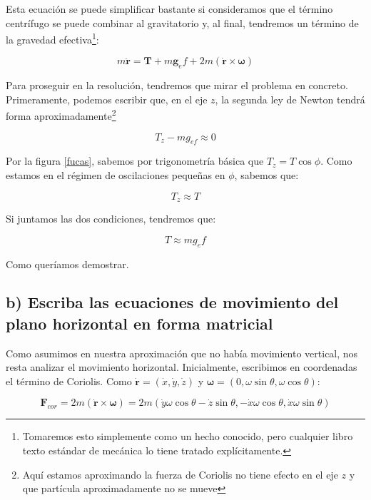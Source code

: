 \documentclass[a4paper,12pt]{article}
\begin{document}
Esta ecuación se puede simplificar bastante si consideramos que el término centrífugo se puede combinar al gravitatorio y, al final, tendremos un término de la gravedad efectiva\footnote{Tomaremos esto simplemente como un hecho conocido, pero cualquier libro texto estándar de mecánica lo tiene tratado explícitamente.}:

\begin{equation}
  \label{initialus1}
  m \ddot{\boldsymbol{r}} = \boldsymbol{T} + m\boldsymbol{g}_ef + 2m (\dot{\boldsymbol{r}} \times \boldsymbol{\omega})
\end{equation}

Para proseguir en la resolución, tendremos que mirar el problema en concreto. Primeramente, podemos escribir que, en el eje $z$, la segunda ley de Newton tendrá forma aproximadamente\footnote{Aquí estamos aproximando la fuerza de Coriolis no tiene efecto en el eje $z$ y que partícula aproximadamente no se mueve   } 

$$T_{z} - mg_{ef} \approx 0$$

Por la figura \ref{fucas}, sabemos por trigonometría básica que $T_{z} = T \cos{\phi}$. Como estamos en el régimen de oscilaciones pequeñas en $\phi$, sabemos que:

\begin{equation}
  T_{z} \approx T
\end{equation}

Si juntamos las dos condiciones, tendremos que:

\begin{equation}
  T \approx m g_ef 
\end{equation}

Como queríamos demostrar.

\subsection*{b) Escriba las ecuaciones de movimiento del plano horizontal en forma matricial}

Como asumimos en nuestra aproximación que no había movimiento vertical, nos resta analizar el movimiento horizontal. Inicialmente, escribimos en coordenadas el término de Coriolis. Como $\dot{\boldsymbol{r}} = (\dot{x},\dot{y},\dot{z})$ y $\boldsymbol{\omega} = (0,\omega \sin\theta, \omega \cos\theta)$:

$$\boldsymbol{F}_{cor} = 2m (\dot{\boldsymbol{r}} \times \boldsymbol{\omega}) = 2 m (\dot{y}\omega \cos\theta-\dot{z} \sin\theta, -\dot{x}\omega \cos\theta, \dot{x} \omega \sin\theta )$$
\end{document}
